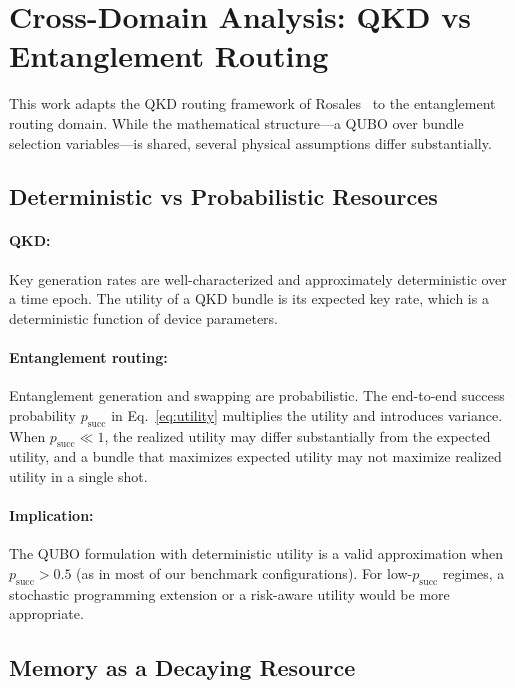 \documentclass[10pt,a4paper]{article}
\begin{document}
\section{Cross-Domain Analysis: QKD vs Entanglement Routing}
\label{sec:discussion}

This work adapts the QKD routing framework of
Rosales~\cite{rosales2025quantum} to the entanglement routing domain.
While the mathematical structure---a QUBO over bundle selection
variables---is shared, several physical assumptions differ
substantially.

\subsection{Deterministic vs Probabilistic Resources}

\paragraph{QKD:}
Key generation rates are well-characterized and approximately
deterministic over a time epoch.  The utility of a QKD bundle is
its expected key rate, which is a deterministic function of
device parameters.

\paragraph{Entanglement routing:}
Entanglement generation and swapping are probabilistic.  The
end-to-end success probability $p_{\text{succ}}$ in
Eq.~\eqref{eq:utility} multiplies the utility and introduces
variance.  When $p_{\text{succ}} \ll 1$, the realized utility may
differ substantially from the expected utility, and a bundle that
maximizes expected utility may not maximize realized utility in a
single shot.

\paragraph{Implication:}
The QUBO formulation with deterministic utility is a valid
approximation when $p_{\text{succ}} > 0.5$ (as in most of our
benchmark configurations).  For low-$p_{\text{succ}}$ regimes, a
stochastic programming extension or a risk-aware utility would
be more appropriate.

\subsection{Memory as a Decaying Resource}
\end{document}

